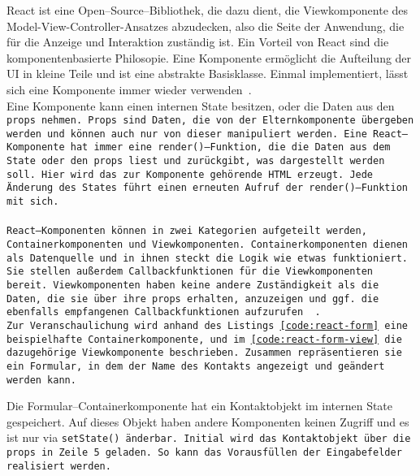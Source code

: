 React ist eine Open--Source--Bibliothek, die dazu dient, die Viewkomponente des Model-View-Controller-Ansatzes abzudecken, also die Seite der Anwendung, die für die Anzeige und Interaktion zuständig ist.
Ein Vorteil von React sind die komponentenbasierte Philosopie. Eine Komponente ermöglicht die Aufteilung der \gls{UI} in kleine Teile und ist eine abstrakte Basisklasse. Einmal implementiert, lässt sich eine Komponente immer wieder verwenden~\cite{react}.\\
%
Eine Komponente kann einen internen State besitzen, oder die Daten aus den \tt{props} nehmen.
\tt{Props} sind Daten, die von der Elternkomponente übergeben werden und können auch nur von dieser manipuliert werden.
Eine React--Komponente hat immer eine \tt{render()}--Funktion, die die Daten aus dem State oder den \tt{props} liest und zurückgibt, was dargestellt werden soll.
Hier wird das zur Komponente gehörende \gls{HTML} erzeugt. Jede Änderung des States führt einen erneuten Aufruf der \tt{render()}--Funktion mit sich.\\\\
%
%
React--Komponenten können in zwei Kategorien aufgeteilt werden, Containerkomponenten und Viewkomponenten.
Containerkomponenten dienen als Datenquelle und in ihnen steckt die Logik wie etwas funktioniert.
Sie stellen außerdem Callbackfunktionen für die Viewkomponenten bereit.
Viewkomponenten haben keine andere Zuständigkeit als die Daten, die sie über ihre \tt{props} erhalten, anzuzeigen und ggf. die ebenfalls empfangenen Callbackfunktionen aufzurufen ~\cite{react-components}.\\
Zur Veranschaulichung wird anhand des Listings \ref{code:react-form} eine beispielhafte Containerkomponente, und im \autoref{code:react-form-view} die dazugehörige Viewkomponente beschrieben.
Zusammen repräsentieren sie ein Formular, in dem der Name des Kontakts angezeigt und geändert werden kann.
%
\begin{center}
  
\end{center}
%
Die Formular--Containerkomponente hat ein Kontaktobjekt im internen State gespeichert.
Auf dieses Objekt haben andere Komponenten keinen Zugriff und es ist nur via \tt{setState()} änderbar.
Initial wird das Kontaktobjekt über die \tt{props} in Zeile 5 geladen. So kann das Vorausfüllen der Eingabefelder realisiert werden.\\
